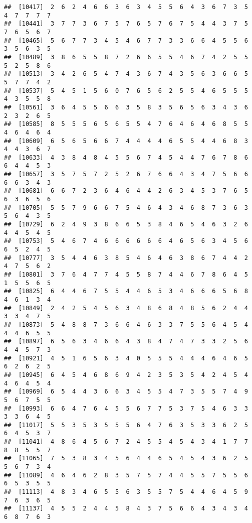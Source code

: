 \documentclass[
]{book}
\begin{document}
\begin{verbatim}
##  [10417]  2  6  2  4  6  6  3  6  3  4  5  5  6  4  3  6  7  3  5  4  7  7  7  7
##  [10441]  3  7  7  3  6  7  5  7  6  5  7  6  7  5  4  4  3  7  5  7  6  5  6  7
##  [10465]  5  6  7  7  3  4  5  4  6  7  7  3  3  6  6  4  5  5  6  3  5  6  3  5
##  [10489]  3  8  6  5  5  8  7  2  6  6  5  5  4  6  7  4  2  5  5  5  2  5  8  6
##  [10513]  3  4  2  6  5  4  7  4  3  6  7  4  3  5  6  3  6  6  5  5  7  7  4  2
##  [10537]  5  4  5  1  5  6  0  7  6  5  6  2  5  5  4  6  5  5  5  4  3  5  5  8
##  [10561]  3  6  4  5  5  6  6  3  5  8  3  5  6  5  6  3  4  3  6  2  3  2  6  5
##  [10585]  8  5  5  5  6  5  6  5  5  4  7  6  4  6  4  6  8  5  5  4  6  4  6  4
##  [10609]  6  5  6  5  6  6  7  4  4  4  4  6  5  5  4  4  6  8  3  4  4  3  6  7
##  [10633]  4  3  8  4  8  4  5  5  6  7  4  5  4  4  7  6  7  8  6  6  4  4  5  3
##  [10657]  3  5  7  5  7  2  5  2  6  7  6  6  4  3  4  7  5  6  6  6  6  3  4  3
##  [10681]  6  6  7  2  3  6  4  6  4  4  2  6  3  4  5  3  7  6  5  6  3  6  5  6
##  [10705]  5  5  7  9  6  6  7  5  4  6  4  3  4  6  8  7  3  6  3  5  6  4  3  5
##  [10729]  6  2  4  9  3  8  6  6  5  3  8  4  6  5  4  6  3  2  6  4  4  5  4  5
##  [10753]  5  4  6  7  4  6  6  6  6  6  6  4  6  5  6  3  4  5  6  6  5  2  4  5
##  [10777]  3  5  4  4  6  3  8  5  4  6  4  6  3  8  6  7  4  4  2  4  7  5  6  2
##  [10801]  3  7  6  4  7  7  4  5  5  8  7  4  4  6  7  8  6  4  5  1  5  5  6  5
##  [10825]  6  4  4  6  7  5  5  4  4  6  5  3  4  6  6  6  5  6  8  4  6  1  3  4
##  [10849]  2  4  2  5  4  5  6  3  4  8  6  8  4  8  5  6  2  4  4  3  3  4  7  5
##  [10873]  5  4  8  8  7  3  6  6  4  6  3  3  7  5  5  6  4  5  4  4  4  6  5  5
##  [10897]  6  5  6  3  4  6  6  4  3  8  4  7  4  7  3  3  2  5  6  4  4  5  7  3
##  [10921]  4  5  1  6  5  6  3  4  0  5  5  5  4  4  4  6  4  6  5  6  2  6  2  5
##  [10945]  6  4  5  4  6  8  6  9  4  2  3  5  3  5  4  2  4  5  4  4  6  4  5  4
##  [10969]  6  5  4  4  3  6  6  3  4  5  5  4  7  3  5  5  7  4  9  5  6  7  5  5
##  [10993]  6  6  4  7  6  4  5  5  6  7  7  5  3  7  5  4  6  3  3  3  3  6  4  5
##  [11017]  5  5  3  5  3  5  5  5  6  4  7  6  3  5  3  3  6  2  5  6  4  5  3  7
##  [11041]  4  8  6  4  5  6  7  2  4  5  5  4  5  4  3  4  1  7  7  8  8  5  5  7
##  [11065]  7  5  3  8  3  4  5  6  4  4  6  5  4  5  4  3  6  2  5  5  6  7  3  4
##  [11089]  4  6  4  6  2  8  3  5  7  5  7  4  4  5  5  7  5  5  6  6  5  3  5  5
##  [11113]  4  8  3  4  6  5  5  6  3  5  5  7  5  4  4  6  4  5  9  7  6  3  6  5
##  [11137]  4  5  5  2  4  4  5  8  4  3  7  5  6  6  4  3  4  3  4  6  8  7  6  3

\end{verbatim}
\end{document}
